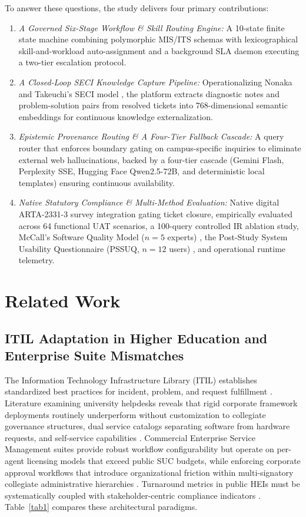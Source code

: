 \documentclass[conference]{IEEEtran}
\begin{document}
To answer these questions, the study delivers four primary contributions:
\begin{enumerate}
    \item \textit{A Governed Six-Stage Workflow \& Skill Routing Engine:} A 10-state finite state machine combining polymorphic MIS/ITS schemas with lexicographical skill-and-workload auto-assignment and a background SLA daemon executing a two-tier escalation protocol.
    \item \textit{A Closed-Loop SECI Knowledge Capture Pipeline:} Operationalizing Nonaka and Takeuchi's SECI model \cite{ref13}, the platform extracts diagnostic notes and problem-solution pairs from resolved tickets into 768-dimensional semantic embeddings for continuous knowledge externalization.
    \item \textit{Epistemic Provenance Routing \& A Four-Tier Fallback Cascade:} A query router that enforces boundary gating on campus-specific inquiries to eliminate external web hallucinations, backed by a four-tier cascade (Gemini Flash, Perplexity SSE, Hugging Face Qwen2.5-72B, and deterministic local templates) ensuring continuous availability.
    \item \textit{Native Statutory Compliance \& Multi-Method Evaluation:} Native digital ARTA-2331-3 survey integration gating ticket closure, empirically evaluated across 64 functional UAT scenarios, a 100-query controlled IR ablation study, McCall's Software Quality Model ($n = 5$ experts) \cite{ref14}, the Post-Study System Usability Questionnaire (PSSUQ, $n = 12$ users) \cite{ref15, ref16}, and operational runtime telemetry.
\end{enumerate}

\section{Related Work}
\subsection{ITIL Adaptation in Higher Education and Enterprise Suite Mismatches}
The Information Technology Infrastructure Library (ITIL) establishes standardized best practices for incident, problem, and request fulfillment \cite{ref6, ref17}. Literature examining university helpdesks reveals that rigid corporate framework deployments routinely underperform without customization to collegiate governance structures, dual service catalogs separating software from hardware requests, and self-service capabilities \cite{ref6, ref7, ref17}. Commercial Enterprise Service Management suites provide robust workflow configurability but operate on per-agent licensing models that exceed public SUC budgets, while enforcing corporate approval workflows that introduce organizational friction within multi-signatory collegiate administrative hierarchies \cite{ref6, ref7}. Turnaround metrics in public HEIs must be systematically coupled with stakeholder-centric compliance indicators \cite{ref18}. Table~\ref{tab1} compares these architectural paradigms.
\end{document}
